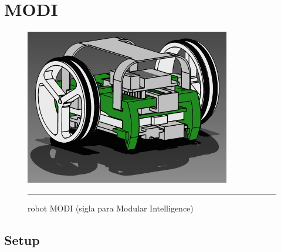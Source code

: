 
\chapter{MODI} %

\label{Chapter3} %



\begin{figure}[htbp]
	\centering
		\includegraphics[width=0.8\textwidth]{./Figures/MODI/render.png}
		\rule{35em}{0.5pt}
	\caption[Setup]{robot MODI (sigla para Modular Intelligence)}
	\label{fig:MODI}
\end{figure}

\section{Setup}

